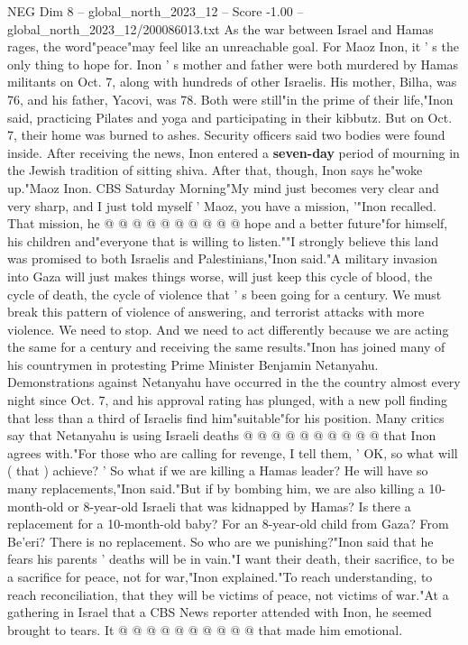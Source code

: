 \begin{textsample}{NEG Dim 8 – global\_north\_2023\_12 – Score -1.00 – global\_north\_2023\_12/200086013.txt}  \label{ex:f8_neg_176}
As the war between Israel and Hamas rages, the word"peace"may feel like an unreachable goal.
For Maoz Inon, it ' s the only thing to hope for.
Inon ' s mother and father were both murdered by Hamas militants on Oct. 7, along with hundreds of other Israelis.
His mother, Bilha, was 76, and his father, Yacovi, was 78.
Both were still"in the prime of their life,"Inon said, practicing Pilates and yoga and participating in their kibbutz.
But on Oct. 7, their home was burned to ashes.
Security officers said two bodies were found inside.
After receiving the news, Inon entered a \textbf{seven-day} period of mourning in the Jewish tradition of sitting shiva.
After that, though, Inon says he"woke up."Maoz Inon.
CBS Saturday Morning"My mind just becomes very clear and very sharp, and I just told myself ' Maoz, you have a mission, '"Inon recalled.
That mission, he @ @ @ @ @ @ @ @ @ @ hope and a better future"for himself, his children and"everyone that is willing to listen.""I strongly believe this land was promised to both Israelis and Palestinians,"Inon said."A military invasion into Gaza will just makes things worse, will just keep this cycle of blood, the cycle of death, the cycle of violence that ' s been going for a century.
We must break this pattern of violence of answering, and terrorist attacks with more violence.
We need to stop.
And we need to act differently because we are acting the same for a century and receiving the same results."Inon has joined many of his countrymen in protesting Prime Minister Benjamin Netanyahu.
Demonstrations against Netanyahu have occurred in the the country almost every night since Oct. 7, and his approval rating has plunged, with a new poll finding that less than a third of Israelis find him"suitable"for his position.
Many critics say that Netanyahu is using Israeli deaths @ @ @ @ @ @ @ @ @ @ that Inon agrees with."For those who are calling for revenge, I tell them, ' OK, so what will ( that ) achieve? ' So what if we are killing a Hamas leader?
He will have so many replacements,"Inon said."But if by bombing him, we are also killing a 10-month-old or 8-year-old Israeli that was kidnapped by Hamas?
Is there a replacement for a 10-month-old baby?
For an 8-year-old child from Gaza?
From Be'eri?
There is no replacement.
So who are we punishing?"Inon said that he fears his parents ' deaths will be in vain."I want their death, their sacrifice, to be a sacrifice for peace, not for war,"Inon explained."To reach understanding, to reach reconciliation, that they will be victims of peace, not victims of war."At a gathering in Israel that a CBS News reporter attended with Inon, he seemed brought to tears.
It @ @ @ @ @ @ @ @ @ @ that made him emotional.

\end{textsample}
